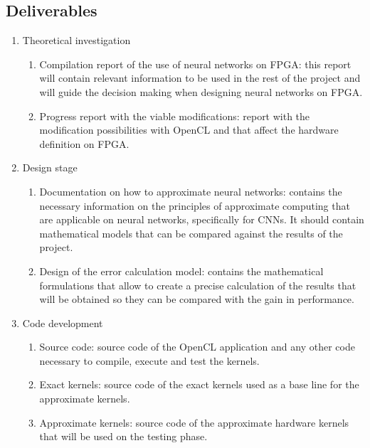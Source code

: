\subsection{Deliverables}

\begin{enumerate}
    \item Theoretical investigation
        \begin{enumerate}
            \item Compilation report of the use of neural networks on FPGA: this report will contain
            relevant information to be used in the rest of the project and will guide the decision
            making when designing neural networks on FPGA. 
            \item Progress report with the viable modifications: report with the modification possibilities
            with OpenCL and that affect the hardware definition on FPGA.
        \end{enumerate}
    \item Design stage
        \begin{enumerate}
            \item Documentation on how to approximate neural networks: contains the necessary information
            on the principles of approximate computing that are applicable on neural networks, specifically
            for CNNs. It should contain mathematical models that can be compared against the results
            of the project.
            \item Design of the error calculation model: contains the mathematical formulations that allow
            to create a precise calculation of the results that will be obtained so they can be compared
            with the gain in performance.
        \end{enumerate}
    \item Code development
        \begin{enumerate}
            \item Source code: source code of the OpenCL application and any other code necessary to
            compile, execute and test the kernels.
            \item Exact kernels: source code of the exact kernels used as a base line for the approximate kernels.
            \item Approximate kernels: source code of the approximate hardware kernels that will be used
            on the testing phase.
        \end{enumerate}

\end{enumerate}
